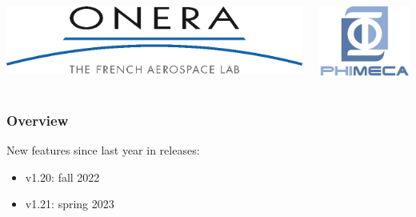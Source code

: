 \documentclass[aspectratio=169]{beamer}
\begin{document}
\begin{frame}
\begin{columns}
  \begin{center}
\includegraphics[height=0.05\textheight]{figures/onera-logo.png}
\end{center}

  \begin{center}
\includegraphics[height=0.08\textheight]{figures/logo-phimeca.png}
\end{center}


  \end{columns}

  \end{frame}

\begin{frame}
\frametitle{Overview}

New features since last year in releases:

\begin{itemize}
\item v1.20: fall 2022
\item v1.21: spring 2023
\end{itemize}

\end{frame}
  


\end{document}
